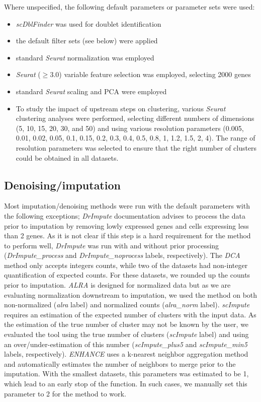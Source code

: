\documentclass{bmcart}
\begin{document}
Where unspecified, the following default parameters or parameter sets were used:
\begin{itemize}
    \item \textit{scDblFinder} was used for doublet identification
    \item the default filter sets (see below) were applied
    \item standard \textit{Seurat} normalization was employed
    \item \textit{Seurat} ($\geq$3.0) variable feature selection was employed, selecting 2000 genes
    \item standard \textit{Seurat} scaling and PCA were employed
    \item To study the impact of upstream steps on clustering, various \textit{Seurat} clustering analyses were performed, selecting different numbers of dimensions (5, 10, 15, 20, 30, and 50) and using various resolution parameters (0.005, 0.01, 0.02, 0.05, 0.1, 0.15, 0.2, 0.3, 0.4, 0.5, 0.8, 1, 1.2, 1.5, 2, 4). The range of resolution parameters was selected to ensure that the right number of clusters could be obtained in all datasets.
\end{itemize}

\subsection*{Denoising/imputation}
Most imputation/denoising methods were run with the default parameters with the following exceptions; \textit{DrImpute} documentation advises to process the data prior to imputation by removing lowly expressed genes and cells expressing less than 2 genes. As it is not clear if this step is a hard requirement for the method to perform well, \textit{DrImpute} was run with and without prior processing (\textit{DrImpute\_process} and \textit{DrImpute\_noprocess} labels, respectively). The \textit{DCA} method only accepts integers counts, while two of the datasets had non-integer quantification of expected counts. For these datasets, we rounded up the counts prior to imputation. \textit{ALRA} is designed for normalized data but as we are evaluating normalization downstream to imputation, we used the method on both non-normalized (\textit{alra} label) and normalized counts (\textit{alra\_norm} label). \textit{scImpute} requires an estimation of the expected number of clusters with the input data. As the estimation of the true number of cluster may not be known by the user, we evaluated the tool using the true number of clusters (\textit{scImpute} label) and using an over/under-estimation of this number (\textit{scImpute\_plus5} and \textit{scImpute\_min5} labels, respectively). \textit{ENHANCE} uses a k-nearest neighbor aggregation method and automatically estimates the number of neighbors to merge prior to the imputation. With the smallest datasets, this parameters was estimated to be 1, which lead to an early stop of the function. In such cases, we manually set this parameter to 2 for the method to work. 
\end{document}
